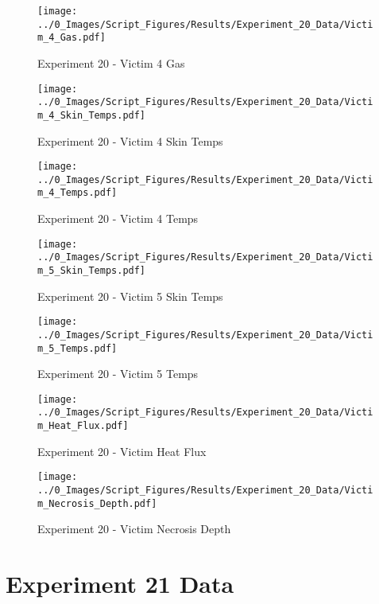 	\clearpage

	\begin{figure}[H]
		\centering
		\texttt{[image: ../0\_Images/Script\_Figures/Results/Experiment\_20\_Data/Victim\_4\_Gas.pdf]}
		\caption[]{Experiment 20 - Victim 4 Gas}
	\end{figure}
 

	\begin{figure}[H]
		\centering
		\texttt{[image: ../0\_Images/Script\_Figures/Results/Experiment\_20\_Data/Victim\_4\_Skin\_Temps.pdf]}
		\caption[]{Experiment 20 - Victim 4 Skin Temps}
	\end{figure}
 
	\clearpage

	\begin{figure}[H]
		\centering
		\texttt{[image: ../0\_Images/Script\_Figures/Results/Experiment\_20\_Data/Victim\_4\_Temps.pdf]}
		\caption[]{Experiment 20 - Victim 4 Temps}
	\end{figure}
 

	\begin{figure}[H]
		\centering
		\texttt{[image: ../0\_Images/Script\_Figures/Results/Experiment\_20\_Data/Victim\_5\_Skin\_Temps.pdf]}
		\caption[]{Experiment 20 - Victim 5 Skin Temps}
	\end{figure}
 
	\clearpage

	\begin{figure}[H]
		\centering
		\texttt{[image: ../0\_Images/Script\_Figures/Results/Experiment\_20\_Data/Victim\_5\_Temps.pdf]}
		\caption[]{Experiment 20 - Victim 5 Temps}
	\end{figure}
 

	\begin{figure}[H]
		\centering
		\texttt{[image: ../0\_Images/Script\_Figures/Results/Experiment\_20\_Data/Victim\_Heat\_Flux.pdf]}
		\caption[]{Experiment 20 - Victim Heat Flux}
	\end{figure}
 
	\clearpage

	\begin{figure}[H]
		\centering
		\texttt{[image: ../0\_Images/Script\_Figures/Results/Experiment\_20\_Data/Victim\_Necrosis\_Depth.pdf]}
		\caption[]{Experiment 20 - Victim Necrosis Depth}
	\end{figure}
 

\clearpage		\large
\section{Experiment 21 Data} \label{App:Exp21Results} 

